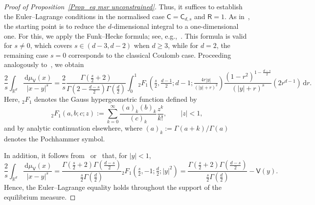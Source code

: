\documentclass{amsart}
\def\R{\mathbb{R}}
\newcommand{\ud}{\, \mathrm{d}}
\theoremstyle{plain}
\theoremstyle{remark}
\numberwithin{equation}{section}
\begin{document}
\begin{proof}[Proof of Proposition~\ref{Prop_eq msr unconstrained}]
Thus, it suffices to establish the Euler--Lagrange conditions in the normalised case $\mathsf{C}= \mathsf{C}_{d,s}$ and $\mathsf{R}=1$. 
As in~\cite{CSW22,CSW23,BFMS26}, the starting point is to reduce the $d$-dimensional integral to a one-dimensional one. For this, we apply the Funk--Hecke formula; see, e.g.,~\cite[Appendix~A.2]{CSW22}. This formula is valid for $s\neq 0$, which covers $s\in(d-3,d-2)$ when $d\ge 3$, while for $d=2$, the remaining case $s=0$ corresponds to the classical Coulomb case. Proceeding analogously to~\cite[Lemma~3.1]{BFMS26}, we obtain 
\begin{equation}
\label{eq:Riesz potential hypergeometric}
    \frac{2}{s}\int_{\R^d}\frac{\ud\mu_\mathsf{V}(x)}{|x-y|^s} =\frac{2}{s} \frac{\Gamma(\frac{s}{2}+2)}{\Gamma(2-\frac{d-s}{2})\Gamma(\frac{d}{2})}
    \int_0^1 {}_2F_1(\tfrac{s}{2},\tfrac{d-1}{2};d-1;\tfrac{4r|y|}{(|y|+r)^2})\frac{(1-r^2)^{1-\frac{d-s}{2}} }{(|y|+r)^s} (2r^{d-1})\ud r. 
\end{equation} 
Here, ${}_2F_1$ denotes the Gauss hypergeometric function \cite[Chapter 15]{NIST} defined by
\begin{equation}
\label{def of 2F1 ftn}
    {}_2F_1(a,b;c;z)
    :=
    \sum_{k=0}^{\infty}
    \frac{(a)_k(b)_k}{(c)_k}
    \frac{z^k}{k!},
    \qquad |z|<1,
\end{equation}
and by analytic continuation elsewhere, where $(a)_k:=\Gamma(a+k)/\Gamma(a)$ denotes the Pochhammer symbol.

 
In addition, it follows from~\cite{CSW22,BFMS26} or~\cite[Theorem~1.2]{GCO23} that, for $|y|<1$,
\begin{equation} \label{EL equality part unconstrained}
    \frac{2}{s}\int_{\R^d}\frac{\ud\mu_\mathsf{V}(x)}{|x-y|^s} =  \frac{\Gamma(\frac{s}{2}+2)\Gamma(\frac{d-s}{2})}{\frac{s}{2}\Gamma(\frac{d}{2})}
    {}_2F_1(\tfrac{s}{2}, -1; \tfrac{d}{2}; |y|^2)= \frac{\Gamma(\frac{s}{2}+2)\Gamma(\frac{d-s}{2})}{\frac{s}{2}\Gamma(\frac{d}{2})}-\mathsf{V}(y).
\end{equation}
Hence, the Euler--Lagrange equality holds throughout the support of the equilibrium measure.


\end{proof}
\end{document}
